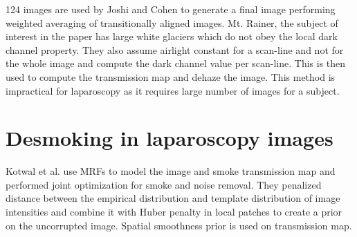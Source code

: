 124 images are used by Joshi and Cohen \cite{joshi2010multi} to generate a final image performing weighted averaging of transitionally aligned images. Mt. Rainer, the subject of interest in the paper has large white glaciers which do not obey the local dark channel property. They also assume airlight constant for a scan-line and not for the whole image and compute the dark channel value per scan-line. This is then used to compute the transmission map and dehaze the image. This method is impractical for laparoscopy as it requires large number of images for a subject. 




\section{Desmoking in laparoscopy images}
Kotwal et al. \cite{kotwal2016joint} use MRFs to model the image and smoke transmission map and performed joint optimization for smoke and noise removal. They penalized distance between the empirical distribution and template distribution of image intensities and combine it with Huber penalty in local patches to create a prior on the uncorrupted image. Spatial smoothness prior is used on transmission map.












